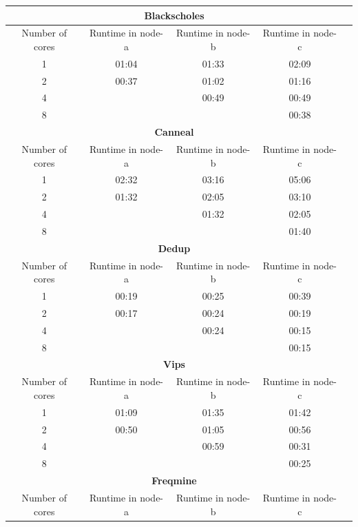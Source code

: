 \begin{enumerate}
\begin{itemize}
\begin{table}[!htp]
            \begin{tabular}{ccccc}\toprule
            \multicolumn{4}{c}{\textbf{Blackscholes}} \\
            \midrule
            Number of cores &Runtime in node-a &Runtime in node-b &Runtime in node-c \\
            \midrule
            1 &01:04 &01:33 &02:09 \\
            2 &00:37 &01:02 &01:16 \\
            4 & &00:49 &00:49 \\
            8 & & &00:38 \\
            \toprule
            \multicolumn{4}{c}{\textbf{Canneal}} \\
            \midrule
            Number of cores &Runtime in node-a &Runtime in node-b &Runtime in node-c \\
            \midrule
            1 &02:32 &03:16 &05:06 \\
            2 &01:32 &02:05 &03:10 \\
            4 & &01:32 &02:05 \\
            8 & & &01:40 \\
            \toprule
            \multicolumn{4}{c}{\textbf{Dedup}} \\
            \midrule
            Number of cores &Runtime in node-a &Runtime in node-b &Runtime in node-c \\
            \midrule
            1 &00:19 &00:25 &00:39 \\
            2 &00:17 &00:24 &00:19 \\
            4 & &00:24 &00:15 \\
            8 & & &00:15 \\
            \toprule
            \multicolumn{4}{c}{\textbf{Vips}} \\
            \midrule
            Number of cores &Runtime in node-a &Runtime in node-b &Runtime in node-c \\
            \midrule
            1 &01:09 &01:35 &01:42 \\
            2 &00:50 &01:05 &00:56 \\
            4 & &00:59 &00:31 \\
            8 & & &00:25 \\
            \toprule
            \multicolumn{4}{c}{\textbf{Freqmine}} \\
            \midrule
            Number of cores &Runtime in node-a &Runtime in node-b &Runtime in node-c \\

\end{tabular}
\end{table}
\end{itemize}
\end{enumerate}
